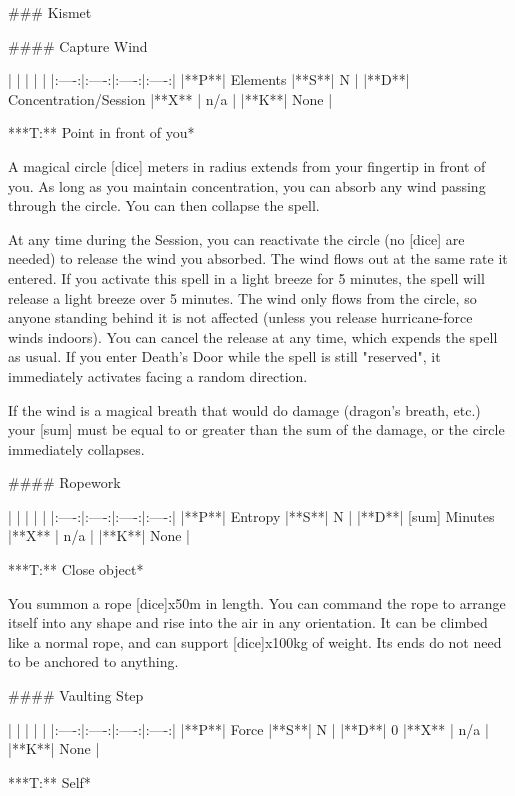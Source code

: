 ### Kismet



#### Capture Wind

| | | | |
|:----:|:----:|:----:|:----:|
|**P**| Elements |**S**|  N |
|**D**| Concentration/Session |**X** |  n/a  |
|**K**| None |


***T:**   Point in front of you*



A magical circle [dice] meters in radius extends from your fingertip in front of you. As long as you maintain concentration, you can absorb any wind passing through the circle. You can then collapse the spell. 

At any time during the Session, you can reactivate the circle (no [dice] are needed) to release the wind you absorbed.  The wind flows out at the same rate it entered. If you activate this spell in a light breeze for 5 minutes, the spell will release a light breeze over 5 minutes. The wind only flows from the circle, so anyone standing behind it is not affected (unless you release hurricane-force winds indoors). You can cancel the release at any time, which expends the spell as usual. If you enter Death's Door while the spell is still "reserved", it immediately activates facing a random direction.  

If the wind is a magical breath that would do damage (dragon's breath, etc.) your [sum] must be equal to or greater than the sum of the damage, or the circle immediately collapses.  




#### Ropework

| | | | |
|:----:|:----:|:----:|:----:|
|**P**| Entropy |**S**|  N |
|**D**| [sum] Minutes |**X** |  n/a  |
|**K**| None |


***T:**   Close object*



You summon a rope [dice]x50m in length.  You can command the rope to arrange itself into any shape and rise into the air in any orientation.  It can be climbed like a normal rope, and can support [dice]x100kg of weight.  Its ends do not need to be anchored to anything.




#### Vaulting Step

| | | | |
|:----:|:----:|:----:|:----:|
|**P**| Force |**S**|  N |
|**D**| 0 |**X** |  n/a  |
|**K**| None |


***T:**   Self*



